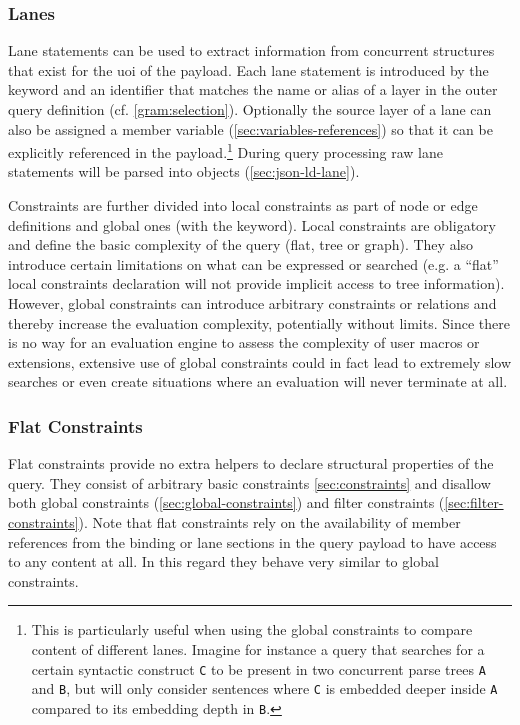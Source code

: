 \documentclass[11pt,a4paper]{article}
\begin{document}
\subsubsection{Lanes}
\label{sec:lanes}
\noindent Lane statements can be used to extract information from concurrent structures that exist for the \ac{uoi} of the payload.
Each lane statement is introduced by the  keyword and an identifier that matches the name or alias of a layer in the outer query definition (cf. \cref{gram:selection}).
Optionally the source layer of a lane can also be assigned a member variable (\ref{sec:variables-references}) so that it can be explicitly referenced in the payload.\footnote{This is particularly useful when using the global constraints to compare content of different lanes. Imagine for instance a query that searches for a certain syntactic construct \texttt{C} to be present in two concurrent parse trees \texttt{A} and \texttt{B}, but will only consider sentences where \texttt{C} is embedded deeper inside \texttt{A} compared to its embedding depth in \texttt{B}.}
During query processing raw lane statements will be parsed into  objects (\ref{sec:json-ld-lane}).


Constraints are further divided into local constraints as part of node or edge definitions and global ones (with the  keyword). 
Local constraints are obligatory and define the basic complexity of the query (flat, tree or graph). 
They also introduce certain limitations on what can be expressed or searched (e.g. a ``flat'' local constraints declaration will not provide implicit access to tree information). 
However, global constraints can introduce arbitrary constraints or relations and thereby increase the evaluation complexity, potentially without limits. 
Since there is no way for an evaluation engine to assess the complexity of user macros or extensions, extensive use of global constraints could in fact lead to extremely slow searches or even create situations where an evaluation will never terminate at all.

\subsubsection{Flat Constraints}
\label{sec:flat-constraints}

Flat constraints provide no extra helpers to declare structural properties of the query. 
They consist of arbitrary basic constraints \cref{sec:constraints} and disallow both global constraints (\ref{sec:global-constraints}) and filter constraints (\ref{sec:filter-constraints}). 
Note that flat constraints rely on the availability of member references from the binding or lane sections in the query payload to have access to any content at all.
In this regard they behave very similar to global constraints.
\end{document}
